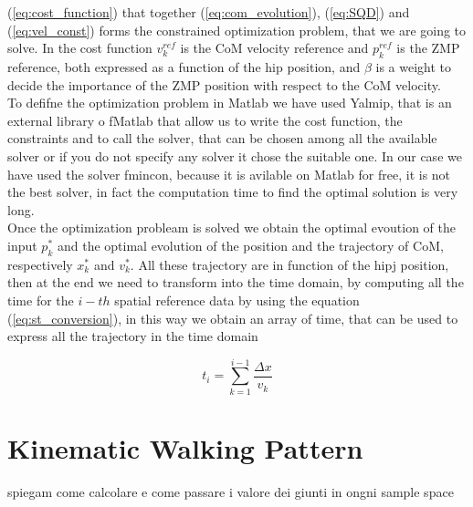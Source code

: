 \documentclass[a4paper]{article}
\begin{document}
(\ref{eq:cost_function}) that together (\ref{eq:com_evolution}), (\ref{eq:SQD}) and (\ref{eq:vel_const}) forms the constrained optimization problem, that we are going to solve. In the cost function $v_k^{ref}$ is the CoM velocity reference and $p_k^{ref}$ is the ZMP reference, both expressed as a function of the hip position, and $\beta$ is a weight to decide the importance of the ZMP position with respect to the CoM velocity.\\
To defifne the optimization problem in Matlab we have used Yalmip, that is an external library o fMatlab that allow us to write the cost function, the constraints and to call the solver, that can be chosen among all the available solver or if you do not specify any solver it chose the suitable one. In our case we have used the solver fmincon, because it is avilable on Matlab for free, it is not the best solver, in fact the computation time to find the optimal solution is very long.\\
Once the optimization probleam is solved we obtain the optimal evoution of the input $p_k^*$ and the optimal evolution of the position and the trajectory of CoM, respectively $x_k^*$ and $v_k^*$. All these trajectory are in function of the hipj position, then at the end we need to transform into the time domain, by computing all the time for the $i-th$ spatial reference data by using the equation (\ref{eq:st_conversion}), in this way we obtain an array of time, that can be used to express all the trajectory in the time domain

\begin{equation}
t_i = \sum_{k=1}^{i-1}{\frac{\Delta x}{v_k}}
\label{eq:st_conversion}
\end{equation}

\section{Kinematic Walking Pattern}
spiegam come calcolare e come passare i valore dei giunti in ongni sample space
\end{document}
